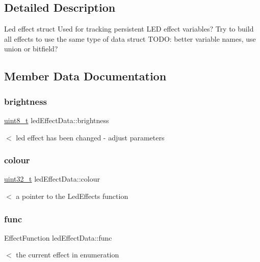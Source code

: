 \subsection{Detailed Description}
Led effect struct Used for tracking persistent L\+ED effect variables? Try to build all effects to use the same type of data struct T\+O\+DO\+: better variable names, use union or bitfield? 

\subsection{Member Data Documentation}
\mbox{\label{structledEffectData_a8d68875aadb518d5292e93d79918d0ae}} 
\subsubsection{\texorpdfstring{brightness}{brightness}}
{\footnotesize\ttfamily \hyperlink{vl53l0x__types_8h_aba7bc1797add20fe3efdf37ced1182c5}{uint8\+\_\+t} led\+Effect\+Data\+::brightness}

$<$ led effect has been changed -\/ adjust parameters \mbox{\label{structledEffectData_ab37d8733a0fc0c336752e382a53c2e6d}} 
\subsubsection{\texorpdfstring{colour}{colour}}
{\footnotesize\ttfamily \hyperlink{vl53l0x__types_8h_a435d1572bf3f880d55459d9805097f62}{uint32\+\_\+t} led\+Effect\+Data\+::colour}

$<$ a pointer to the Led\+Effects function \mbox{\label{structledEffectData_afda152477a636903c30cdb311e4d739b}} 
\subsubsection{\texorpdfstring{func}{func}}
{\footnotesize\ttfamily Effect\+Function led\+Effect\+Data\+::func}

$<$ the current effect in enumeration \mbox{\label{structledEffectData_af3091722f500797cff2896050b7ac3b4}} 
